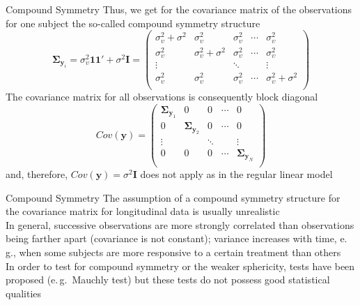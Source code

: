 \documentclass{beamer}
\newcommand{\vect}[1]{\mathbf{#1}}
\newcommand{\mat}[1]{\mathbf{#1}}
\newcommand{\gvect}[1]{\boldsymbol{#1}}
\begin{document}
\begin{frame}{Compound Symmetry}
  Thus, we get for the covariance matrix of the observations for one subject
  the so-called compound symmetry structure
\[
  \gvect{\Sigma}_{\vect{y}_i} = \sigma^2_\upsilon \vect{1} \vect{1}'
    + \sigma^2 \mat{I}
  = 
  \begin{pmatrix}
    \sigma^2_\upsilon + \sigma^2 & \sigma^2_\upsilon & \sigma^2_\upsilon &
      \cdots & \sigma^2_\upsilon \\
    \sigma^2_\upsilon & \sigma^2_\upsilon  + \sigma^2 & \sigma^2_\upsilon &
      \cdots & \sigma^2_\upsilon \\
    \vdots & & \ddots & & \vdots \\
    \sigma^2_\upsilon & \sigma^2_\upsilon  & \sigma^2_\upsilon &
      \cdots & \sigma^2_\upsilon + \sigma^2 \\
  \end{pmatrix}
\]
The covariance matrix for all observations is consequently block diagonal
\[
  Cov(\vect{y}) =
  \begin{pmatrix}
  \gvect{\Sigma}_{\vect{y}_1} & 0 & 0 & \cdots & 0 \\
  0  & \gvect{\Sigma}_{\vect{y}_2} & 0 & \cdots & 0 \\
  \vdots &  & \ddots &  & \vdots \\
  0 & 0 & 0 & \cdots & \gvect{\Sigma}_{\vect{y}_N} \\
  \end{pmatrix}
\]
and, therefore, $Cov(\vect{y}) = \sigma^2 \mat{I}$ does not apply as in the
  regular linear model
\end{frame}


\begin{frame}{Compound Symmetry}
  The assumption of a compound symmetry structure for the covariance matrix
  for longitudinal data is usually unrealistic\\[2ex]

  In general, successive observations are more strongly correlated than
  observations being farther apart (covariance is not constant); variance
  increases with time, e.\,g., when some subjects are more responsive to a
  certain treatment than others\\[2ex]

  In order to test for compound symmetry or the weaker sphericity, tests
  have been proposed (e.\,g.\ Mauchly test) but these tests do not possess
  good statistical qualities
\end{frame}
\end{document}
